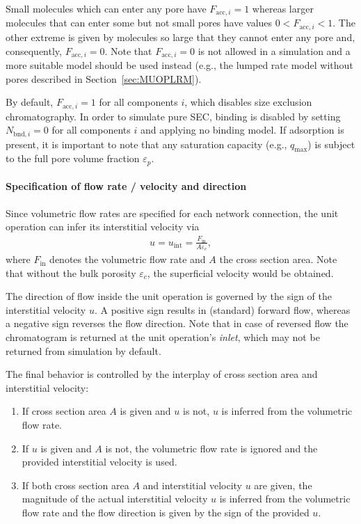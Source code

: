 Small molecules which can enter any pore have $F_{\text{acc},i} = 1$ whereas larger molecules that can enter some but not small pores have values $0 < F_{\text{acc},i} < 1$.
The other extreme is given by molecules so large that they cannot enter any pore and, consequently, $F_{\text{acc},i} = 0$.
Note that $F_{\text{acc},i} = 0$ is not allowed in a simulation and a more suitable model should be used instead (e.g., the lumped rate model without pores described in Section~\ref{sec:MUOPLRM}).

By default, $F_{\text{acc},i} = 1$ for all components $i$, which disables size exclusion chromatography.
In order to simulate pure SEC, binding is disabled by setting $N_{\text{bnd},i} = 0$ for all components $i$ and applying no binding model.
If adsorption is present, it is important to note that any saturation capacity (e.g., $q_{\text{max}}$) is subject to the full pore volume fraction $\varepsilon_p$.

\paragraph{Specification of flow rate / velocity and direction}
\label{par:MUOPGRMflow}

Since volumetric flow rates are specified for each network connection, the unit operation can infer its interstitial velocity via
\begin{align*}
	u = u_{\text{int}} = \frac{F_{\text{in}}}{A \varepsilon_c},
\end{align*}
where $F_{\text{in}}$ denotes the volumetric flow rate and $A$ the cross section area.
Note that without the bulk porosity $\varepsilon_c$, the superficial velocity would be obtained.

The direction of flow inside the unit operation is governed by the sign of the interstitial velocity $u$.
A positive sign results in (standard) forward flow, whereas a negative sign reverses the flow direction.
Note that in case of reversed flow the chromatogram is returned at the unit operation's \emph{inlet}, which may not be returned from simulation by default.

The final behavior is controlled by the interplay of cross section area and interstitial velocity:
\begin{enumerate}
	\item If cross section area $A$ is given and $u$ is not, $u$ is inferred from the volumetric flow rate.
	\item If $u$ is given and $A$ is not, the volumetric flow rate is ignored and the provided interstitial velocity is used.
	\item If both cross section area $A$ and interstitial velocity $u$ are given, the magnitude of the actual interstitial velocity $u$ is inferred from the volumetric flow rate and the flow direction is given by the sign of the provided $u$.
\end{enumerate}

